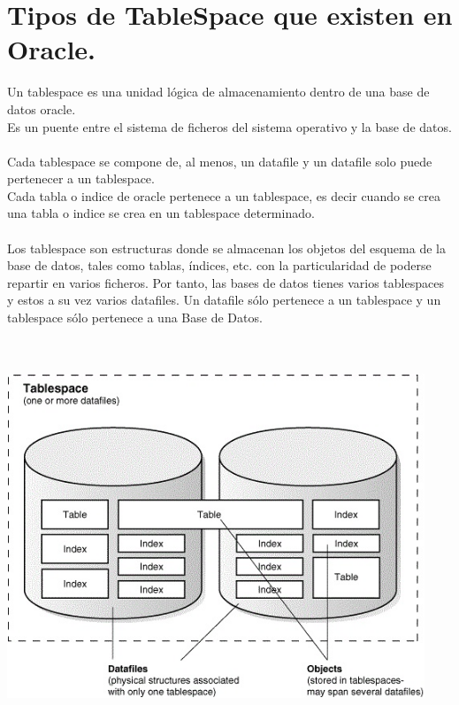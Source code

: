 \section{Tipos de TableSpace que existen en Oracle.} 
\vspace{\baselineskip}
Un tablespace es una unidad lógica de almacenamiento dentro de una base de datos oracle.\\
Es un puente entre el sistema de ficheros del sistema operativo y la base de datos.\\ \\
Cada tablespace se compone de, al menos, un datafile y un datafile solo puede pertenecer a un tablespace.\\
Cada tabla o indice de oracle pertenece a un tablespace, es decir cuando se crea una tabla o indice se crea en un tablespace determinado.\\ \\
Los tablespace son estructuras donde se almacenan los objetos del esquema de la base de datos, tales como tablas, índices, etc. con la particularidad de poderse repartir en varios ficheros. Por tanto, las bases de datos tienes varios tablespaces y estos a su vez varios datafiles. Un datafile sólo pertenece a un tablespace y un tablespace sólo pertenece a una Base de Datos.
\\
\\
\\
\begin{center}
	\includegraphics[width=12.5cm]{./Imagenes/4} 
\end{center}

\vspace{\baselineskip}

